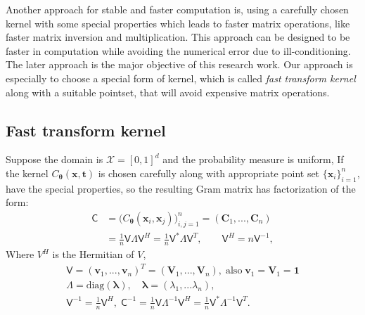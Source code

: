 \documentclass[smallextended]{svjour3}       %
\newcommand{\bm}[1]{\boldsymbol{#1}}
\newcommand{\vlambda}{{\bm{\lambda}}}
\newcommand{\vtheta}{{\bm{\theta}}}
\newcommand{\vC}{\bm{C}}
\newcommand{\vt}{\bm{t}}
\newcommand{\vv}{\bm{v}}
\newcommand{\vV}{\bm{V}}
\newcommand{\vx}{\bm{x}}
\newcommand{\vone}{\bm{1}}
\newcommand{\mC}{\mathsf{C}}
\newcommand{\mCInv}{{\mathsf{C}^{-1}}}
\newcommand{\mLambda}{\mathsf{\Lambda}}
\newcommand{\mV}{\mathsf{V}}
\newcommand{\diag}{\text{diag}}
\begin{document}
Another approach for stable and faster computation is, using a carefully chosen kernel with some special properties which leads to faster matrix operations, like faster matrix inversion and multiplication. 
This approach can be designed to be faster in computation while avoiding the numerical error due to ill-conditioning. 
The later approach is the major objective of this research work. 
Our approach is especially to choose a special form of kernel, which is called \emph{fast transform kernel} along with a suitable pointset, that will avoid expensive matrix operations.






\subsection{Fast transform kernel}
Suppose the domain is $\mathcal{X} = [0,1]^d$ and the probability measure is uniform, If the kernel $C_\vtheta(\vx,\vt)$ is chosen carefully along with appropriate point set $\{\vx_i\}_{i=1}^n$, have the special properties, so the resulting Gram matrix has factorization of the form:
\begin{align}
\nonumber
\mC &= \Big(C_\vtheta(\vx_i,\vx_j)\Big)_{i,j=1}^n  = (\vC_1,...,\vC_n) 
\\
\label{eqn:ftk_factor}
&= \frac 1n \mV \mLambda \mV^H  = \frac 1n \mV^* \mLambda \mV^T , 
\quad \quad \mV^H = n \mV^{-1},
\end{align}
Where $V^H$ is the Hermitian of $V$,
\begin{gather*}
\mV = (\vv_1,...,\vv_n)^T = (\vV_1,...,\vV_n), \; \text{also} \;  \vv_1 = \vV_1 = \vone
\\
\mLambda = \diag(\vlambda), \quad 
\vlambda = (\lambda_1, ... \lambda_n),
\\
\mV^{-1} = \frac 1n \mV^H, \;
\mCInv  = \frac 1n \mV \mLambda^{-1} \mV^H
 = \frac 1n \mV^* \mLambda^{-1} \mV^T
.
\end{gather*}
\end{document}
